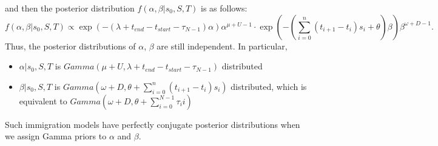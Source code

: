 and then the posterior distribution $f(\alpha, \beta | s_0,S,T)$ is as follows:
$$ f(\alpha, \beta | s_0,S,T) \propto \exp(-(\lambda + t_{end} - t_{start}- \tau_{N - 1})\alpha) \alpha^{\mu + U -1} \cdot \exp(-(\sum_{i=0}^n (t_{i+1} - t_i)s_i + \theta)\beta) \beta^{\omega+ D -1}.$$
Thus, the posterior distributions of $\alpha$, $\beta$ are still independent. In
particular,
\begin{itemize}
\item $\alpha | s_0,S,T$ is $Gamma(\mu+ U,\lambda + t_{end} - t_{start}- \tau_{N - 1})$ distributed\\
\item $\beta | s_0,S,T$ is $Gamma(\omega+ D,\theta + \sum_{i=0}^n (t_{i+1} - t_i)s_i)$ distributed, which is equivalent to $Gamma(\omega+ D,\theta +\sum_{i=0}^{N - 1} \tau_ii)$\\
\end{itemize}
Such immigration models have perfectly conjugate posterior distributions when we 
assign Gamma priors to $\alpha$ and $\beta$. 
